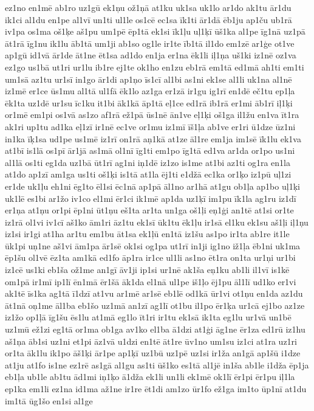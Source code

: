 {ez1no
en1mē
ab1ro
uz1gū
ek1ņu
ož1ņā
at1ku
uk1sa
uk1lo
ar1do
ak1tu
ār1du
ik1ci
al1du
en1pe
al1vī
un1ti
ul1le
os1cē
ec1sa
īk1ti
ār1dā
ēb1ju
ap1ču
ub1rā
iv1pa
os1ma
oš1ķe
aš1pu
um1pē
ēp1tā
ek1si
īk1ļu
uļ1ķī
ūš1ka
al1pe
īg1nā
uz1pā
āt1rā
īg1nu
ik1lu
āb1tā
um1ji
ab1so
og1le
ir1te
īb1tā
il1do
em1zē
ar1ģe
ot1ve
ap1gū
id1vā
ār1de
āt1ne
ēt1sa
ad1do
en1ja
er1na
ēk1li
iļ1ņa
uš1ki
iz1nē
oz1va
ez1go
us1bā
ut1ri
ur1lu
ib1re
ej1te
ok1ho
en1zu
eb1rā
em1tā
ed1mā
ah1ti
em1ti
um1sā
az1tu
ur1sī
in1go
ār1di
ap1ņo
īs1cī
al1bi
as1ni
ek1se
al1li
uk1na
al1nē
iz1mē
er1ce
ūs1mu
al1tā
ul1fā
ēk1lo
az1ga
er1zā
ir1gu
ig1rī
en1dē
eč1tu
ep1ļa
ēk1ta
uz1dē
ur1su
īc1ku
it1bi
āk1kā
āp1tā
eļ1ce
ed1rā
ib1rā
er1mi
āb1rī
iļ1ķi
or1mē
em1pi
os1vā
as1zo
af1rā
ež1pā
ūs1nē
ān1ve
eļ1ķi
oš1ga
il1žu
en1va
īt1ra
ak1ri
up1tu
ad1ka
eļ1zī
ir1nē
ec1ve
or1mu
iz1mī
īš1ļa
ab1ve
er1ri
ū1dze
ūz1ni
in1ka
īķ1sa
ud1pe
us1mē
iz1rī
on1rā
aņ1kā
at1ze
āl1re
em1ja
im1sē
īk1lu
ek1va
at1bī
is1lā
os1pī
ār1jā
as1mā
ol1nī
īg1ti
em1po
īg1tā
ed1va
ar1da
or1po
us1ni
al1lā
os1ti
eg1da
uz1bā
ūt1rī
ag1ni
iņ1dē
iz1zo
is1me
at1bi
az1ti
og1ra
en1la
at1do
ap1zī
am1ga
us1ti
oš1ķi
is1tā
at1la
ēj1ti
e1džā
ec1ka
or1ķo
iz1pū
uļ1zi
er1de
uk1ļu
eh1ni
ēg1to
ēl1si
ēc1nā
ap1pā
āl1no
ar1hā
at1gu
ob1ļa
ap1bo
uļ1ķi
uk1lē
es1bi
ar1žo
iv1co
el1mi
ēr1ci
ik1mē
ap1da
uz1ķī
im1pu
īk1la
ag1ru
iz1dī
er1ņa
at1ņu
or1pi
ēp1ni
ūt1ņu
eš1ta
ar1ta
un1ga
oš1ļi
eņ1ģi
an1tē
at1si
or1te
iz1rā
ol1vi
iv1cī
aš1ko
ām1ri
āz1tu
ek1sī
ūk1tu
ēk1ļu
ir1sā
el1ku
ek1su
aš1ļi
iļ1ņu
iz1si
ir1gi
at1ha
ar1tu
em1bu
āt1sa
ek1ļū
en1tā
iz1šu
as1po
ir1ta
ab1re
it1le
ūk1pi
uņ1ne
aš1vi
ām1pa
ār1sē
ok1si
og1pa
ut1rī
in1ji
ig1no
iž1ļa
ēb1ni
uk1ma
ēp1šu
ol1vē
ēz1ta
am1kā
ed1fo
āp1ra
ir1ce
ul1li
as1no
ēt1ra
on1ta
ur1ņi
ur1bi
iz1cē
us1ki
eb1ša
ož1me
an1gī
āv1ji
ip1si
ur1nē
ak1ša
eņ1ku
ab1li
il1vī
is1kē
om1pā
ir1mī
ip1lī
ēn1mā
ēr1šā
āk1da
el1nā
ul1pe
iš1ļo
ēj1pu
āl1lī
ud1ko
er1vi
ak1tē
īs1ka
ag1tā
ī1dzī
at1vu
ar1mē
ar1sē
eb1lē
od1kā
ūr1vi
ot1ņu
en1da
az1du
āt1nā
oņ1me
āl1ba
eb1šo
uz1mā
an1zī
ag1lī
ot1bu
il1po
ēr1ķa
ur1cā
ej1bo
az1ze
iz1žo
op1ļā
īg1šu
ēs1lu
at1mā
eg1lo
īt1ri
ir1tu
ek1sā
ik1ta
eg1lu
ur1vā
un1bē
uz1mū
ež1zi
eg1tā
or1ma
ob1ga
av1ko
el1ba
ā1dzi
at1ģi
āg1ne
ēr1za
ed1rū
iz1hu
aš1ņa
āb1si
uz1ni
et1pi
āz1vā
u1dzi
en1tē
āt1re
ūv1no
um1su
iz1ci
at1ra
uz1ri
or1ta
āk1lu
ik1po
āš1ķi
ār1pe
ap1ķī
uz1bū
uz1pē
uz1si
ir1ža
an1gā
ap1šū
i1dze
at1ju
at1fo
is1ne
ez1rē
as1gā
al1gu
as1ti
ūš1ko
es1tā
al1jē
in1ša
ab1le
i1dža
ēp1ja
eb1ļa
ub1le
ab1tu
ād1mi
iņ1ķo
ā1dža
ek1li
un1li
ek1mē
ok1lī
ēr1pi
ēr1pu
iļ1la
ep1ka
em1li
ez1na
id1ma
až1ne
ir1re
ēt1di
am1zo
ūr1fo
ež1ga
im1to
ūp1nī
at1du
im1tā
ūg1šo
en1si
al1ge
}
